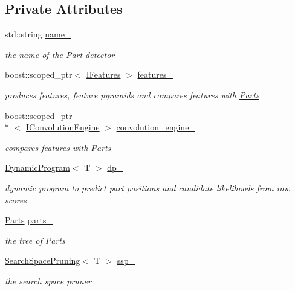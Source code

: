 \subsection*{Private Attributes}
\begin{DoxyCompactItemize}
\item 
std\-::string \hyperlink{class_parts_based_detector_a776c766541fb4c2974c6b40a8f4f1c2f}{name\-\_\-}
\begin{DoxyCompactList}\small\item\em the name of the Part detector \end{DoxyCompactList}\item 
boost\-::scoped\-\_\-ptr$<$ \hyperlink{class_i_features}{I\-Features} $>$ \hyperlink{class_parts_based_detector_a6242f9b02fcb1a440cc431f2fc15521f}{features\-\_\-}
\begin{DoxyCompactList}\small\item\em produces features, feature pyramids and compares features with \hyperlink{class_parts}{Parts} \end{DoxyCompactList}\item 
boost\-::scoped\-\_\-ptr\\*
$<$ \hyperlink{class_i_convolution_engine}{I\-Convolution\-Engine} $>$ \hyperlink{class_parts_based_detector_ad06eb05d590004fe4f6940544b90b2ba}{convolution\-\_\-engine\-\_\-}
\begin{DoxyCompactList}\small\item\em compares features with \hyperlink{class_parts}{Parts} \end{DoxyCompactList}\item 
\hyperlink{class_dynamic_program}{Dynamic\-Program}$<$ T $>$ \hyperlink{class_parts_based_detector_af78da81781a7ad393e9e150f02ecd129}{dp\-\_\-}
\begin{DoxyCompactList}\small\item\em dynamic program to predict part positions and candidate likelihoods from raw scores \end{DoxyCompactList}\item 
\hyperlink{class_parts}{Parts} \hyperlink{class_parts_based_detector_ad548ec9214858535eb6a0f3783d11664}{parts\-\_\-}
\begin{DoxyCompactList}\small\item\em the tree of \hyperlink{class_parts}{Parts} \end{DoxyCompactList}\item 
\hyperlink{class_search_space_pruning}{Search\-Space\-Pruning}$<$ T $>$ \hyperlink{class_parts_based_detector_aae91c693f9d01e3e6cbd552d7f81e474}{ssp\-\_\-}
\begin{DoxyCompactList}\small\item\em the search space pruner \end{DoxyCompactList}\end{DoxyCompactItemize}


